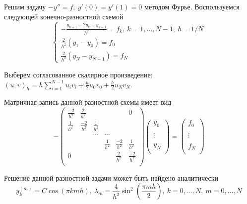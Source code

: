 \begin{example}
  Решим задачу $-y''=f,\ y'(0)=y'(1)=0$ методом Фурье.
  Воспользуемся следующей конечно-разностной схемой
  \[\begin{cases}
      -\frac{y_{k+1}-2y_{k}+y_{k-1}}{h^2}=f_k,\ k=1,\ldots,N-1,\ h=1/N \\
      \frac{2}{h^2}(y_1-y_0)=f_0                                       \\
      \frac{2}{h^2}(y_{N}-y_{N-1})=f_N
    \end{cases}
  \]

  Выберем согласованное скалярное произведение: $(u,v)_h=h\sum_{i=1}^{N-1}u_iv_i+\frac{h}{2}u_0v_0+\frac{h}{2}u_Nv_N$.

  Матричная запись данной разностной схемы имеет вид
  \[-\left(\begin{array}{cccccc}
        \frac{-2}{h^2} & \frac{2}{h^2}  &               &               &                & 0              \\
        \frac{1}{h^2}  & \frac{-2}{h^2} & \frac{1}{h^2} &               &                &                \\
                       &                & \cdots        & \cdots        &                &                \\
                       &                &               & \frac{1}{h^2} & \frac{-2}{h^2} & \frac{1}{h^2}  \\
        0              &                &               &               & \frac{2}{h^2}  & \frac{-2}{h^2} \\
      \end{array}\right)
    \left(\begin{array}{c}
        y_{0}  \\
        \\
        \vdots \\
        \\
        y_{N}  \\
      \end{array}\right)
    =\left(\begin{array}{c}
        f_{0}  \\
        \\
        \vdots \\
        \\
        f_{N}  \\
      \end{array}\right)\]

  Решение данной разностной задачи может быть найдено аналитически
  \[y_{k}^{(m)}=C\cos(\pi kmh),\ \lambda_m = \frac{4}{h^2}\sin^2\left(\frac{\pi m h}{2}\right),\ k=0,\ldots,N,\ m=0,\ldots,N\]


\end{example}
